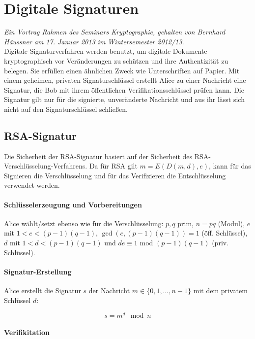 \documentclass[a4paper,12pt,oneside]{scrreprt}
\begin{document}
\section*{Digitale Signaturen}

\textit{Ein Vortrag Rahmen des Seminars Kryptographie, gehalten von Bernhard Häussner am 17. Januar 2013 im Wintersemester 2012/13. }\\

Digitale Signaturverfahren werden benutzt, um digitale Dokumente kryptographisch vor Veränderungen zu schützen und ihre Authentizität zu belegen. 
Sie erfüllen einen ähnlichen Zweck wie Unterschriften auf Papier. Mit einem geheimen, privaten Signaturschlüssel erstellt Alice zu einer
Nachricht eine Signatur, die Bob mit ihrem öffentlichen Verifikationsschlüssel prüfen kann. 
Die Signatur gilt nur für die signierte, unveränderte Nachricht und aus ihr lässt sich
nicht auf den Signaturschlüssel schließen. 

\subsection*{RSA-Signatur}

Die Sicherheit der RSA-Signatur basiert auf der Sicherheit des RSA-Verschlüsselung-Verfahrens. 
Da für RSA gilt $m = E(D(m,d),e)$, kann für das Signieren die Verschlüsselung und für das Verifizieren die
Entschlüsselung verwendet werden. 

\paragraph{Schlüsselerzeugung und Vorbereitungen}

Alice wählt/setzt ebenso wie für die Verschlüsselung: $p, q$ prim, $n = pq$ (Modul), $e$ 
mit $1 < e < (p-1)(q-1)$, $\gcd(e,(p-1)(q-1)) = 1$ (öff. Schlüssel),
$d$ mit $1 < d < (p-1)(q-1)$ und $de \equiv 1$ mod $(p-1)(q-1)$ (priv. Schlüssel). 

\paragraph{Signatur-Erstellung}

Alice erstellt die Signatur $s$ der Nachricht $m \in \{0,1,\dots,n-1\}$ mit dem privatem Schlüssel $d$: 

\[ s = m^d \mod n \]

\paragraph{Verifikitation}
\end{document}
